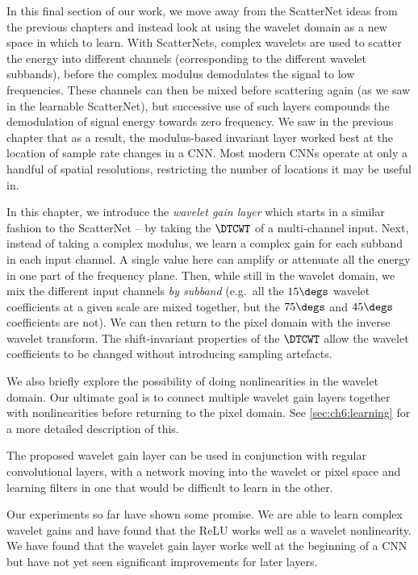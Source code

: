 In this final section of our work, we move away from the ScatterNet ideas from the previous
chapters and instead look at using the wavelet domain as a new space in which to
learn. With ScatterNets, complex wavelets are used to scatter the energy into
different channels (corresponding to the different wavelet subbands), before the
complex modulus demodulates the signal to low frequencies. These channels can
then be mixed before scattering again (as we saw in the learnable ScatterNet),
but successive use of such layers compounds the demodulation of signal energy
towards zero frequency. We saw in the previous chapter that as a result, the
modulus-based invariant layer worked best at the location of sample rate changes
in a CNN\@. Most modern CNNs
operate at only a handful of spatial resolutions, restricting the number of
locations it may be useful in.

In this chapter, we introduce the \emph{wavelet gain layer}
which starts in a similar fashion to the ScatterNet -- by taking the $\DTCWT$ of
a multi-channel input. Next, instead of taking a complex modulus, we learn a
complex gain for each subband in each input channel. A single value here can
amplify or attenuate all the energy in one part of the frequency plane. Then,
while still in the wavelet domain, we mix the different input channels \emph{by subband} (e.g.\
all the $15\degs$ wavelet coefficients at a given scale are mixed together, but
the $75\degs$ and $45\degs$ coefficients are not). We can then return to the
pixel domain with the inverse wavelet transform. The shift-invariant properties
of the $\DTCWT$ allow the wavelet coefficients to be changed without
introducing sampling artefacts.

We also briefly explore the possibility of doing nonlinearities in the wavelet
domain. Our ultimate goal is to connect multiple wavelet gain layers
together with nonlinearities before returning to the pixel domain. See
\autoref{sec:ch6:learning} for a more detailed description of this.

The proposed wavelet gain layer can be used in conjunction with regular
convolutional layers, with a network moving into the wavelet or pixel space and
learning filters in one that would be difficult to learn in the other.

Our experiments so far have shown some promise. We are able to learn complex
wavelet gains and have found that the ReLU works well as a wavelet nonlinearity.
We have found that the wavelet gain layer works well at the beginning of a
CNN but have not yet seen significant improvements for later layers.


